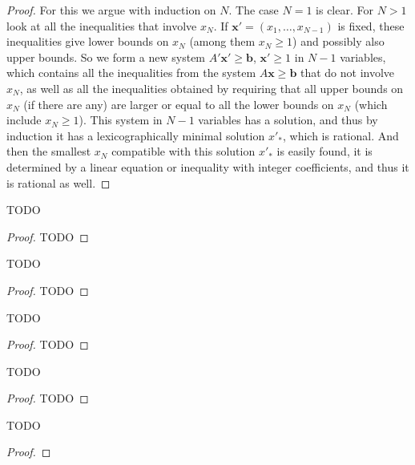 \begin{proof}
  For this we argue with induction on \( N \). The case \( N = 1 \) is clear. For \( N > 1 \)
  look at all the inequalities that involve \( x_N \). If \( \mathbf{x}' = (x_1, \ldots, x_{N-1}) \) is fixed,
  these inequalities give lower bounds on \( x_N \) (among them \( x_N \geq 1 \)) and
  possibly also upper bounds. So we form a new system \( A' \mathbf{x}' \geq \mathbf{b} \), \( \mathbf{x}' \geq 1 \)
  in \( N-1 \) variables, which contains all the inequalities from the system
  \( A\mathbf{x} \geq \mathbf{b} \) that do not involve \( x_N \), as well as all the inequalities obtained
  by requiring that all upper bounds on \( x_N \) (if there are any) are larger or
  equal to all the lower bounds on \( x_N \) (which include \( x_N \geq 1 \)). This system
  in \( N-1 \) variables has a solution, and thus by induction it has a lexicographically
  minimal solution \( x'_*\), which is rational. And then the smallest
  \( x_N \) compatible with this solution \( x'_*\) is easily found, it is determined by a
  linear equation or inequality with integer coefficients, and thus it is rational as well.
\end{proof}


\begin{theorem}
  \label{bricard_condition}
  TODO
\end{theorem}
\begin{proof}
  TODO
\end{proof}

\begin{theorem}[Example 1]
  \label{example1}
  TODO
\end{theorem}
\begin{proof}
    TODO
\end{proof}

\begin{theorem}[Example 2]
  \label{example2}
  TODO
\end{theorem}
\begin{proof}
    TODO
\end{proof}

\begin{theorem}[Example 3]
  \label{example3}
  TODO
\end{theorem}
\begin{proof}
    TODO
\end{proof}

\begin{theorem}
  \label{hilberts_third}
  TODO
\end{theorem}
\begin{proof}
\end{proof}


